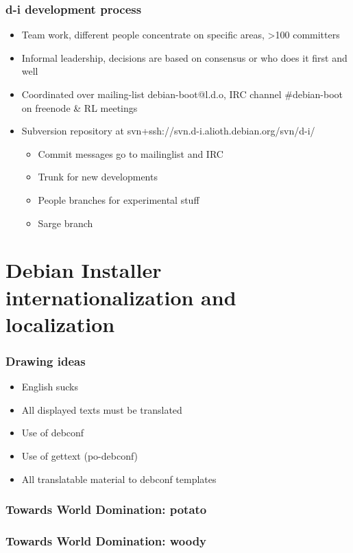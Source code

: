 \documentclass{beamer}
\begin{document}
\begin{frame}
  \frametitle{d-i development process}
	\begin{itemize}
	\item
		Team work, different people concentrate on specific areas, >100 committers
	\item
		Informal leadership, decisions are based on consensus or who does it first and well
	\item
		Coordinated over mailing-list debian-boot@l.d.o, IRC channel \#debian-boot on freenode \& RL meetings 
	\item
		Subversion repository at svn+ssh://svn.d-i.alioth.debian.org/svn/d-i/
		\begin{itemize}
			\item
				Commit messages go to mailinglist and IRC
			\item
				Trunk for new developments
			\item
				People branches for experimental stuff
			\item
				Sarge branch
		\end{itemize}
	\end{itemize}
\end{frame}



\section{Debian Installer internationalization and localization}

\begin{frame}
  \frametitle{Drawing ideas}
	\begin{itemize}
	\item
		English sucks
	\item
		All displayed texts must be translated
	\item
		Use of debconf
	\item
		Use of gettext (po-debconf)
	\item
		All translatable material to debconf templates
	\end{itemize}
\end{frame}

\begin{frame}
  \frametitle{Towards World Domination: potato}
\end{frame}

\begin{frame}
  \frametitle{Towards World Domination: woody}
\end{frame}
\end{document}
